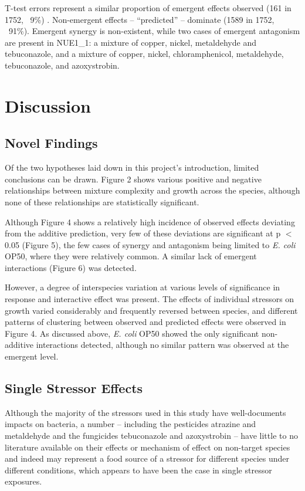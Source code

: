 \documentclass[final,1p,times]{elsarticle}
\begin{document}
T-test errors represent a similar proportion of emergent effects observed (161 in 1752, ~9\%) . Non-emergent effects – “predicted” – dominate (1589 in 1752, ~91\%). Emergent synergy is non-existent, while two cases of emergent antagonism are present in NUE1\_1: a mixture of copper, nickel, metaldehyde and tebuconazole, and a mixture of copper, nickel, chloramphenicol, metaldehyde, tebuconazole, and azoxystrobin.

\section{Discussion}
\label{S:4}

\subsection{Novel Findings}
\label{S:4:1}

Of the two hypotheses laid down in this project’s introduction, limited conclusions can be drawn. Figure 2 shows various positive and negative relationships between mixture complexity and growth across the species, although none of these relationships are statistically significant. 

Although Figure 4 shows a relatively high incidence of observed effects deviating from the additive prediction, very few of these deviations are significant at p $<$ 0.05 (Figure 5), the few cases of synergy and antagonism being limited to \textit{E. coli} OP50, where they were relatively common. A similar lack of emergent interactions (Figure 6) was detected. 

However, a degree of interspecies variation at various levels of significance in response and interactive effect was present. The effects of individual stressors on growth varied considerably and frequently reversed between species, and different patterns of clustering between observed and predicted effects were observed in Figure 4. As discussed above, \textit{E. coli} OP50 showed the only significant non-additive interactions detected, although no similar pattern was observed at the emergent level. 

\subsection{Single Stressor Effects}
\label{S:4:2}

Although the majority of the stressors used in this study have well-documents impacts on bacteria, a number – including the pesticides atrazine and metaldehyde and the fungicides tebuconazole and azoxystrobin – have little to no literature available on their effects or mechanism of effect on non-target species and indeed may represent a food source of a stressor for different species under different conditions, which appears to have been the case in single stressor exposures.
\end{document}
